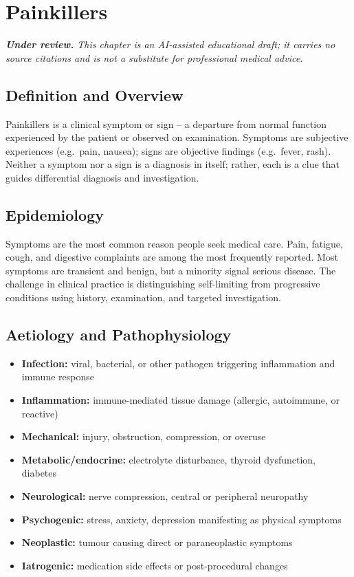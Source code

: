 \chapter{Painkillers}

\medskip
\noindent\textit{\textbf{Under review.} This chapter is an AI-assisted educational draft; it carries no source citations and is not a substitute for professional medical advice.}

\section*{Definition and Overview}
Painkillers is a clinical symptom or sign -- a departure from normal function experienced by the patient or observed on examination. Symptoms are subjective experiences (e.g.\ pain, nausea); signs are objective findings (e.g.\ fever, rash). Neither a symptom nor a sign is a diagnosis in itself; rather, each is a clue that guides differential diagnosis and investigation.

\section*{Epidemiology}
Symptoms are the most common reason people seek medical care. Pain, fatigue, cough, and digestive complaints are among the most frequently reported. Most symptoms are transient and benign, but a minority signal serious disease. The challenge in clinical practice is distinguishing self-limiting from progressive conditions using history, examination, and targeted investigation.

\section*{Aetiology and Pathophysiology}
\begin{itemize}
    \item \textbf{Infection:} viral, bacterial, or other pathogen triggering inflammation and immune response
    \item \textbf{Inflammation:} immune-mediated tissue damage (allergic, autoimmune, or reactive)
    \item \textbf{Mechanical:} injury, obstruction, compression, or overuse
    \item \textbf{Metabolic/endocrine:} electrolyte disturbance, thyroid dysfunction, diabetes
    \item \textbf{Neurological:} nerve compression, central or peripheral neuropathy
    \item \textbf{Psychogenic:} stress, anxiety, depression manifesting as physical symptoms
    \item \textbf{Neoplastic:} tumour causing direct or paraneoplastic symptoms
    \item \textbf{Iatrogenic:} medication side effects or post-procedural changes
\end{itemize}

